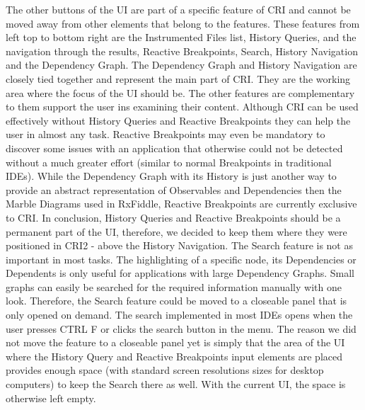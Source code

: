 The other buttons of the UI are part of a specific feature of CRI and cannot be moved away from other elements that belong to the features. These features from left top to bottom right are the Instrumented Files list, History Queries, and the navigation through the results, Reactive Breakpoints, Search, History Navigation and the Dependency Graph. The Dependency Graph and History Navigation are closely tied together and represent the main part of CRI. They are the working area where the focus of the UI should be. The other features are complementary to them support the user ins examining their content. Although CRI can be used effectively without History Queries and Reactive Breakpoints they can help the user in almost any task. Reactive Breakpoints may even be mandatory to discover some issues with an application that otherwise could not be detected without a much greater effort (similar to normal Breakpoints in traditional IDEs). While the Dependency Graph with its History is just another way to provide an abstract representation of Observables and Dependencies then the Marble Diagrams used in RxFiddle, Reactive Breakpoints are currently exclusive to CRI. In conclusion, History Queries and Reactive Breakpoints should be a permanent part of the UI, therefore, we decided to keep them where they were positioned in CRI2 - above the History Navigation. The Search feature is not as important in most tasks. The highlighting of a specific node, its Dependencies or Dependents is only useful for applications with large Dependency Graphs. Small graphs can easily be searched for the required information manually with one look. Therefore, the Search feature could be moved to a closeable panel that is only opened on demand. The search implemented in most IDEs opens when the user presses CTRL F or clicks the search button in the menu. The reason we did not move the feature to a closeable panel yet is simply that the area of the UI where the History Query and Reactive Breakpoints input elements are placed provides enough space (with standard screen resolutions sizes for desktop computers) to keep the Search there as well. With the current UI, the space is otherwise left empty. %

